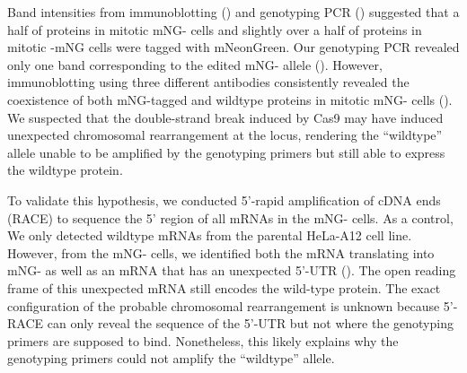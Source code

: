 Band intensities from immunoblotting () and genotyping PCR () suggested that a half of  proteins in mitotic mNG- cells and slightly over a half of  proteins in mitotic -mNG cells were tagged with mNeonGreen. Our genotyping PCR revealed only one band corresponding to the edited mNG- allele (). However, immunoblotting using three different antibodies consistently revealed the coexistence of both mNG-tagged and wildtype  proteins in mitotic mNG- cells (). We suspected that the double-strand break induced by Cas9 may have induced unexpected chromosomal rearrangement at the  locus, rendering the ``wildtype'' allele unable to be amplified by the genotyping primers but still able to express the wildtype  protein.

To validate this hypothesis, we conducted 5'-rapid amplification of cDNA ends (RACE) to sequence the 5' region of all  mRNAs in the mNG- cells. As a control, We only detected wildtype  mRNAs from the parental HeLa-A12 cell line. However, from the mNG- cells, we identified both the mRNA translating into mNG- as well as an mRNA that has an unexpected 5'-UTR (). The open reading frame of this unexpected mRNA still encodes the wild-type  protein. The exact configuration of the probable chromosomal rearrangement is unknown because 5'-RACE can only reveal the sequence of the 5'-UTR but not where the genotyping primers are supposed to bind. Nonetheless, this likely explains why the genotyping primers could not amplify the ``wildtype'' allele.

